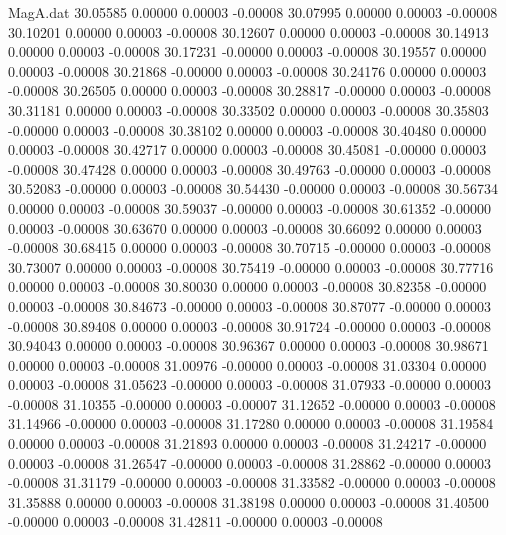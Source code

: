 \begin{filecontents}{MagA.dat}
  30.05585    0.00000    0.00003   -0.00008
  30.07995    0.00000    0.00003   -0.00008
  30.10201    0.00000    0.00003   -0.00008
  30.12607    0.00000    0.00003   -0.00008
  30.14913    0.00000    0.00003   -0.00008
  30.17231   -0.00000    0.00003   -0.00008
  30.19557    0.00000    0.00003   -0.00008
  30.21868   -0.00000    0.00003   -0.00008
  30.24176    0.00000    0.00003   -0.00008
  30.26505    0.00000    0.00003   -0.00008
  30.28817   -0.00000    0.00003   -0.00008
  30.31181    0.00000    0.00003   -0.00008
  30.33502    0.00000    0.00003   -0.00008
  30.35803   -0.00000    0.00003   -0.00008
  30.38102    0.00000    0.00003   -0.00008
  30.40480    0.00000    0.00003   -0.00008
  30.42717    0.00000    0.00003   -0.00008
  30.45081   -0.00000    0.00003   -0.00008
  30.47428    0.00000    0.00003   -0.00008
  30.49763   -0.00000    0.00003   -0.00008
  30.52083   -0.00000    0.00003   -0.00008
  30.54430   -0.00000    0.00003   -0.00008
  30.56734    0.00000    0.00003   -0.00008
  30.59037   -0.00000    0.00003   -0.00008
  30.61352   -0.00000    0.00003   -0.00008
  30.63670    0.00000    0.00003   -0.00008
  30.66092    0.00000    0.00003   -0.00008
  30.68415    0.00000    0.00003   -0.00008
  30.70715   -0.00000    0.00003   -0.00008
  30.73007    0.00000    0.00003   -0.00008
  30.75419   -0.00000    0.00003   -0.00008
  30.77716    0.00000    0.00003   -0.00008
  30.80030    0.00000    0.00003   -0.00008
  30.82358   -0.00000    0.00003   -0.00008
  30.84673   -0.00000    0.00003   -0.00008
  30.87077   -0.00000    0.00003   -0.00008
  30.89408    0.00000    0.00003   -0.00008
  30.91724   -0.00000    0.00003   -0.00008
  30.94043    0.00000    0.00003   -0.00008
  30.96367    0.00000    0.00003   -0.00008
  30.98671    0.00000    0.00003   -0.00008
  31.00976   -0.00000    0.00003   -0.00008
  31.03304    0.00000    0.00003   -0.00008
  31.05623   -0.00000    0.00003   -0.00008
  31.07933   -0.00000    0.00003   -0.00008
  31.10355   -0.00000    0.00003   -0.00007
  31.12652   -0.00000    0.00003   -0.00008
  31.14966   -0.00000    0.00003   -0.00008
  31.17280    0.00000    0.00003   -0.00008
  31.19584    0.00000    0.00003   -0.00008
  31.21893    0.00000    0.00003   -0.00008
  31.24217   -0.00000    0.00003   -0.00008
  31.26547   -0.00000    0.00003   -0.00008
  31.28862   -0.00000    0.00003   -0.00008
  31.31179   -0.00000    0.00003   -0.00008
  31.33582   -0.00000    0.00003   -0.00008
  31.35888    0.00000    0.00003   -0.00008
  31.38198    0.00000    0.00003   -0.00008
  31.40500   -0.00000    0.00003   -0.00008
  31.42811   -0.00000    0.00003   -0.00008

\end{filecontents}
